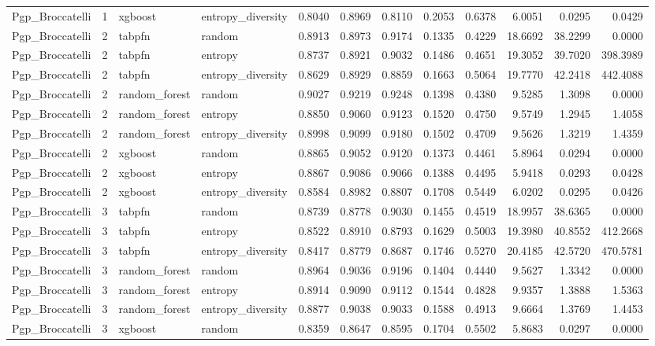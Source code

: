 \begin{tabular}{lrllrrrrrrrr}
Pgp_Broccatelli & 1 & xgboost & entropy_diversity & 0.8040 & 0.8969 & 0.8110 & 0.2053 & 0.6378 & 6.0051 & 0.0295 & 0.0429 \\
Pgp_Broccatelli & 2 & tabpfn & random & 0.8913 & 0.8973 & 0.9174 & 0.1335 & 0.4229 & 18.6692 & 38.2299 & 0.0000 \\
Pgp_Broccatelli & 2 & tabpfn & entropy & 0.8737 & 0.8921 & 0.9032 & 0.1486 & 0.4651 & 19.3052 & 39.7020 & 398.3989 \\
Pgp_Broccatelli & 2 & tabpfn & entropy_diversity & 0.8629 & 0.8929 & 0.8859 & 0.1663 & 0.5064 & 19.7770 & 42.2418 & 442.4088 \\
Pgp_Broccatelli & 2 & random_forest & random & 0.9027 & 0.9219 & 0.9248 & 0.1398 & 0.4380 & 9.5285 & 1.3098 & 0.0000 \\
Pgp_Broccatelli & 2 & random_forest & entropy & 0.8850 & 0.9060 & 0.9123 & 0.1520 & 0.4750 & 9.5749 & 1.2945 & 1.4058 \\
Pgp_Broccatelli & 2 & random_forest & entropy_diversity & 0.8998 & 0.9099 & 0.9180 & 0.1502 & 0.4709 & 9.5626 & 1.3219 & 1.4359 \\
Pgp_Broccatelli & 2 & xgboost & random & 0.8865 & 0.9052 & 0.9120 & 0.1373 & 0.4461 & 5.8964 & 0.0294 & 0.0000 \\
Pgp_Broccatelli & 2 & xgboost & entropy & 0.8867 & 0.9086 & 0.9066 & 0.1388 & 0.4495 & 5.9418 & 0.0293 & 0.0428 \\
Pgp_Broccatelli & 2 & xgboost & entropy_diversity & 0.8584 & 0.8982 & 0.8807 & 0.1708 & 0.5449 & 6.0202 & 0.0295 & 0.0426 \\
Pgp_Broccatelli & 3 & tabpfn & random & 0.8739 & 0.8778 & 0.9030 & 0.1455 & 0.4519 & 18.9957 & 38.6365 & 0.0000 \\
Pgp_Broccatelli & 3 & tabpfn & entropy & 0.8522 & 0.8910 & 0.8793 & 0.1629 & 0.5003 & 19.3980 & 40.8552 & 412.2668 \\
Pgp_Broccatelli & 3 & tabpfn & entropy_diversity & 0.8417 & 0.8779 & 0.8687 & 0.1746 & 0.5270 & 20.4185 & 42.5720 & 470.5781 \\
Pgp_Broccatelli & 3 & random_forest & random & 0.8964 & 0.9036 & 0.9196 & 0.1404 & 0.4440 & 9.5627 & 1.3342 & 0.0000 \\
Pgp_Broccatelli & 3 & random_forest & entropy & 0.8914 & 0.9090 & 0.9112 & 0.1544 & 0.4828 & 9.9357 & 1.3888 & 1.5363 \\
Pgp_Broccatelli & 3 & random_forest & entropy_diversity & 0.8877 & 0.9038 & 0.9033 & 0.1588 & 0.4913 & 9.6664 & 1.3769 & 1.4453 \\
Pgp_Broccatelli & 3 & xgboost & random & 0.8359 & 0.8647 & 0.8595 & 0.1704 & 0.5502 & 5.8683 & 0.0297 & 0.0000 \\

\end{tabular}
